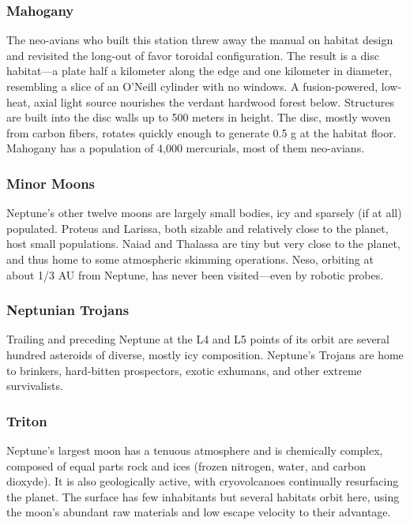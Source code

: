 \subsubsection{Mahogany}

The neo-avians who built this station threw away 
the manual on habitat design and revisited the long-out of favor toroidal configuration. The result is a 
disc habitat—a plate half a kilometer along the edge 
and one kilometer in diameter, resembling a slice 
of an O'Neill cylinder with no windows. A fusion-powered, low-heat, axial light source nourishes 
the verdant hardwood forest below. Structures are 
built into the disc walls up to 500 meters in height. 
The disc, mostly woven from carbon fibers, rotates 
quickly enough to generate 0.5 g at the habitat floor. 
Mahogany has a population of 4,000 mercurials, 
most of them neo-avians.

\subsubsection{Minor Moons}

Neptune's other twelve moons are largely small 
bodies, icy and sparsely (if at all) populated. Proteus 
and Larissa, both sizable and relatively close to the 
planet, host small populations. Naiad and Thalassa 
are tiny but very close to the planet, and thus home to 
some atmospheric skimming operations. Neso, orbiting at about 1/3 AU from Neptune, has never been 
visited—even by robotic probes.

\subsubsection{Neptunian Trojans}

Trailing and preceding Neptune at the L4 and L5 
points of its orbit are several hundred asteroids of 
diverse, mostly icy composition. Neptune's Trojans 
are home to brinkers, hard-bitten prospectors, exotic 
exhumans, and other extreme survivalists.

\subsubsection{Triton}

Neptune's largest moon has a tenuous atmosphere and 
is chemically complex, composed of equal parts rock 
and ices (frozen nitrogen, water, and carbon dioxyde). 
It is also geologically active, with cryovolcanoes continually resurfacing the planet. The surface has few 
inhabitants but several habitats orbit here, using the 
moon's abundant raw materials and low escape velocity to their advantage.

